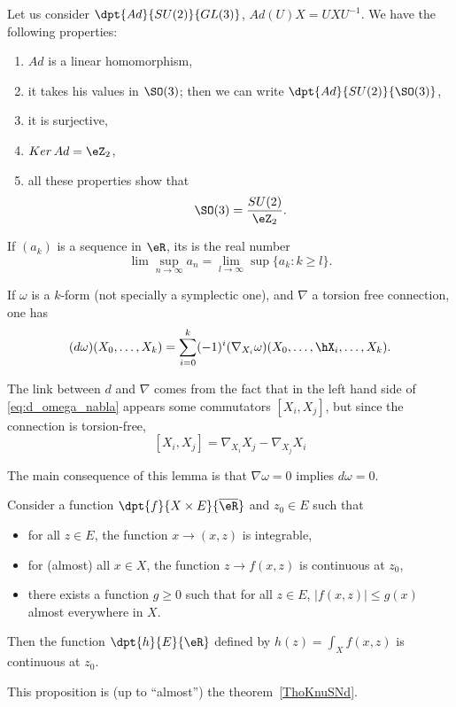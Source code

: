 \begin{theorem} \label{1503t1}
	Let us consider $\dpt{Ad}{SU(2)}{GL(3)}$, $Ad(U)X=UXU^{-1}$. We have the following properties:

	\begin{enumerate}
		\item $Ad$ is a linear homomorphism,
		\item it takes his values in $\SO(3)$; then we can write $\dpt{Ad}{SU(2)}{\SO(3)}$,
		\item it is surjective,
		\item $Ker\,Ad=\eZ_2$,
		\item all these properties show that \[\SO(3)=\frac{SU(2)}{\eZ_2}.\]
	\end{enumerate}
\end{theorem}

\begin{definition}
	If $(a_k)$ is a sequence in $\eR$, its  is the real number
	\[
		\lim\sup_{n\to\infty}a_n=\lim_{l\to\infty}\sup\{a_k:k\geq l\}.
	\]
\end{definition}

\begin{lemma}
	If $\omega$ is a $k$-form (not specially a symplectic one), and $\nabla$ a torsion free connection, one has
	\begin{equation}\label{eq:d_omega_nabla}
		(d\omega)(X_0,\ldots,X_k)=\sum_{i=0}^k (-1)^i(\nabla_{X_i}\omega)(X_0,\ldots,\hX_i,\ldots, X_k).
	\end{equation}
\end{lemma}

\begin{remark}
	The link between $d$ and $\nabla$ comes from the fact that in the left hand side of \eqref{eq:d_omega_nabla} appears some commutators $[X_i,X_j]$, but since the connection is torsion-free,
	\[
		[X_i,X_j]=\nabla_{X_i}X_j-\nabla_{X_j}X_i
	\]
\end{remark}
The main consequence of this lemma is that $\nabla\omega=0$ implies $d\omega=0$.

\begin{proposition} \label{prop:fdefint}
	Consider a function $\dpt{f}{X\times E}{\overline{\eR}}$ and $z_0\in E$ such that
	\begin{itemize}
		\item for all $z\in E$, the function $x\to(x,z)$ is integrable,
		\item for (almost) all $x\in X$, the function $z\to f(x,z)$ is continuous at $z_0$,
		\item there exists a function $g\geq 0$ such that for all $z\in E$, $| f(x,z) |\leq g(x)$ almost everywhere in $X$.
	\end{itemize}
	Then the function $\dpt{h}{E}{\eR}$ defined by $h(z)=\int_Xf(x,z)$ is continuous at $z_0$.
\end{proposition}
This proposition is (up to ``almost'') the theorem~\ref{ThoKnuSNd}.

